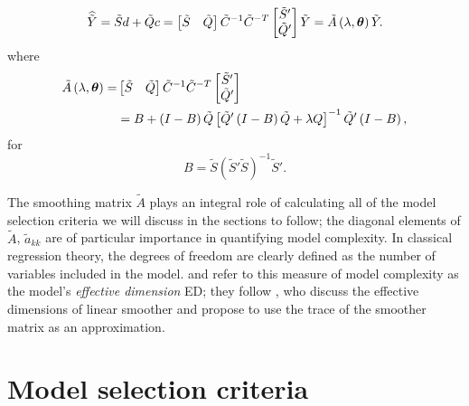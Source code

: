 \documentclass[12pt]{article}
\newcommand{\tildeY}{\tilde{Y}}
\newcommand{\tildeQ}{\tilde{Q}}
\newcommand{\tildeA}{\tilde{A}}
\newcommand{\bftheta}{\mbox{\boldmath $\theta$}}
\newcommand{\tildeS}{\tilde{S}}
\theoremstyle{definition}
\begin{document}
\begin{equation} \label{eq:tildeY-hat-equals-tildeA-tildeY}
\widehat{\tildeY} = \tildeS d + \tildeQ c = \begin{bmatrix} \tildeS & \tildeQ \end{bmatrix} \tilde{C}^{-1} \tilde{C}^{-T} \begin{bmatrix} \tildeS' \\ \tildeQ' \end{bmatrix} \tildeY = \tildeA\left(\lambda, \bftheta\right) \tildeY.
\end{equation} 
\noindent
where
\begin{align}
\begin{split} \label{eq:cholesky-tildeA}
\tildeA\left(\lambda, \bftheta \right) =& \begin{bmatrix} \tildeS & \tildeQ \end{bmatrix} \tilde{C}^{-1} \tilde{C}^{-T} \begin{bmatrix} \tildeS' \\ \tildeQ' \end{bmatrix}  \\
&= B + \left(I - B\right) \tildeQ \left[\tildeQ'\left( I - B \right)\tildeQ + \lambda Q\right]^{-1} \tildeQ'\left(I - B\right),
\end{split}
\end{align} 
\noindent
for
\[
B = \tildeS\left(\tildeS' \tildeS \right)^{-1}\tildeS'.
\]


The smoothing matrix $\tildeA$ plays an integral role of calculating all of the model selection criteria we will discuss in the sections to follow;  the diagonal elements of $\tildeA$, $\tilde{a}_{kk}$ are of particular importance in quantifying  model complexity. In classical regression theory, the degrees of freedom are clearly defined as the number of variables included in the model. \citet{eilers1996flexible} and\citet{marx2005multidimensional} refer to this measure of model complexity as the model's \emph{effective dimension} ED; they follow \citet{hastie1990generalized}, who discuss the effective dimensions of linear smoother and propose to use the trace of the smoother matrix as an approximation. 

\section{Model selection criteria}
\end{document}
